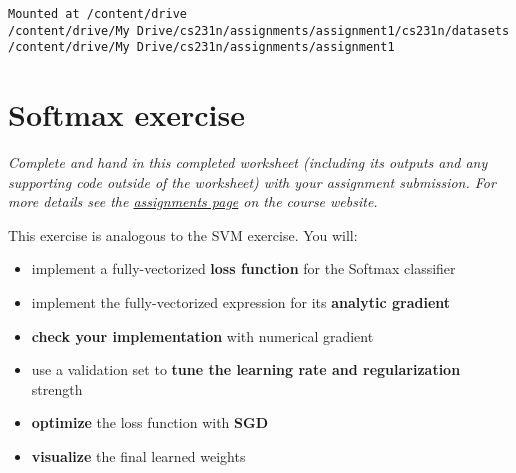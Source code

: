 \documentclass[11pt]{article}
\providecommand{\tightlist}{%
      \setlength{\itemsep}{0pt}\setlength{\parskip}{0pt}}
\begin{document}
    \begin{Verbatim}[commandchars=\\\{\}]
Mounted at /content/drive
/content/drive/My Drive/cs231n/assignments/assignment1/cs231n/datasets
/content/drive/My Drive/cs231n/assignments/assignment1
    \end{Verbatim}

    \hypertarget{softmax-exercise}{%
\section{Softmax exercise}\label{softmax-exercise}}

\emph{Complete and hand in this completed worksheet (including its
outputs and any supporting code outside of the worksheet) with your
assignment submission. For more details see the
\href{http://vision.stanford.edu/teaching/cs231n/assignments.html}{assignments
page} on the course website.}

This exercise is analogous to the SVM exercise. You will:

\begin{itemize}
\tightlist
\item
  implement a fully-vectorized \textbf{loss function} for the Softmax
  classifier
\item
  implement the fully-vectorized expression for its \textbf{analytic
  gradient}
\item
  \textbf{check your implementation} with numerical gradient
\item
  use a validation set to \textbf{tune the learning rate and
  regularization} strength
\item
  \textbf{optimize} the loss function with \textbf{SGD}
\item
  \textbf{visualize} the final learned weights
\end{itemize}
\end{document}
